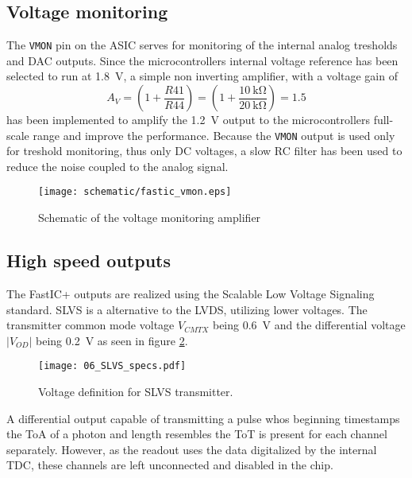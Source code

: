 \subsection{Voltage monitoring}
%
The \verb|VMON| pin on the ASIC serves for monitoring of the internal analog tresholds and DAC outputs. Since the microcontrollers internal voltage reference has been selected to run at \SI{1.8}{\volt}, a simple non inverting amplifier, with a voltage gain of
%
\begin{equation}
    A_V = \left( 1 + \frac{R41}{R44}\right) = \left( 1 + \frac{\SI{10}{\kilo\ohm}}{\SI{20}{\kilo\ohm}}\right) = 1.5
\end{equation}
%
has been implemented to amplify the \SI{1.2}{\volt} output to the microcontrollers full-scale range and improve the performance. Because the \verb|VMON| output is used only for treshold monitoring, thus only DC voltages, a slow RC filter has been used to reduce the noise coupled to the analog signal.
%
\FloatBarrier
\begin{figure}[htp!]
    \centering
    \texttt{[image: schematic/fastic\_vmon.eps]}
    \caption{Schematic of the voltage monitoring amplifier}
    \label{fig:fastic_vmon}
\end{figure}
\FloatBarrier
%
\subsection{High speed outputs}
%
The FastIC+ outputs are realized using the Scalable Low Voltage Signaling standard. SLVS is a alternative to the LVDS, utilizing lower voltages. The transmitter common mode voltage $V_{CMTX}$ being \SI{0.6}{\volt} and the differential voltage $|V_{OD}|$ being \SI{0.2}{\volt} as seen in figure \ref{fig:slvs_voltages}.

\begin{figure}[ht]
	\begin{center}
		\texttt{[image: 06\_SLVS\_specs.pdf]}
	\end{center}
	\vspace{-5mm}
	\caption{Voltage definition for SLVS transmitter.}
	\label{fig:slvs_voltages}
\end{figure}

A differential output capable of transmitting a pulse whos beginning timestamps the ToA of a photon and length resembles the ToT is present for each channel separately. However, as the readout uses the data digitalized by the internal TDC, these channels are left unconnected and disabled in the chip.

